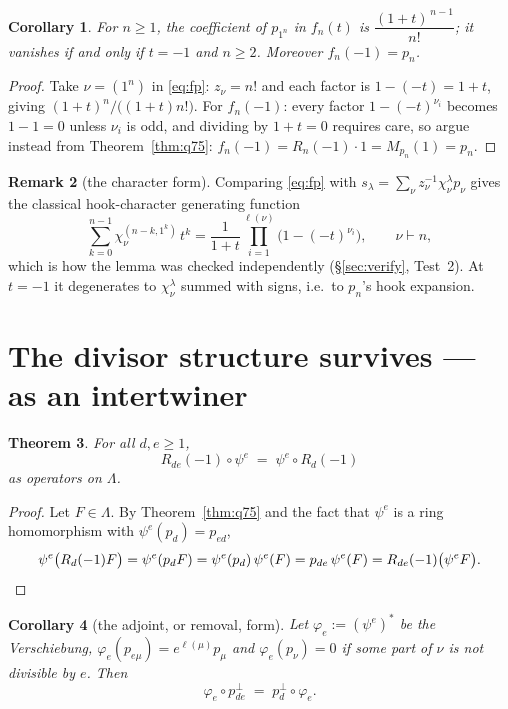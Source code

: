 \documentclass[11pt]{article}
\newtheorem{theorem}{Theorem}
\newtheorem{corollary}[theorem]{Corollary}
\theoremstyle{definition}
\newtheorem{remark}[theorem]{Remark}
\newcommand{\Lam}{\Lambda}
\newcommand{\Mult}[1]{M_{#1}}
\begin{document}
\begin{corollary}\label{cor:coeff}
For $n\ge1$, the coefficient of $p_{1^{n}}$ in $f_n(t)$ is $\dfrac{(1+t)^{\,n-1}}{n!}$; it
vanishes if and only if $t=-1$ and $n\ge2$.  Moreover $f_n(-1)=p_n$.
\end{corollary}

\begin{proof}
Take $\nu=(1^{n})$ in \eqref{eq:fp}: $z_\nu=n!$ and each factor is $1-(-t)=1+t$, giving
$(1+t)^{n}/\bigl((1+t)n!\bigr)$.  For $f_n(-1)$: every factor $1-(-t)^{\nu_i}$ becomes
$1-1=0$ unless $\nu_i$ is odd, and dividing by $1+t=0$ requires care, so argue instead from
Theorem~\ref{thm:q75}: $f_n(-1)=R_n(-1)\cdot1=\Mult{p_n}(1)=p_n$.
\end{proof}

\begin{remark}[the character form]
Comparing \eqref{eq:fp} with $s_\lambda=\sum_\nu z_\nu^{-1}\chi^{\lambda}_\nu p_\nu$ gives the
classical hook-character generating function
\[
  \sum_{k=0}^{n-1}\chi^{(n-k,1^{k})}_{\nu}\,t^{k}
  =\frac{1}{1+t}\prod_{i=1}^{\ell(\nu)}\bigl(1-(-t)^{\nu_i}\bigr),\qquad \nu\vdash n,
\]
which is how the lemma was checked independently (\S\ref{sec:verify}, Test~2).  At $t=-1$ it
degenerates to $\chi^{\lambda}_\nu$ summed with signs, i.e.\ to $p_n$'s hook expansion.
\end{remark}

\section{The divisor structure survives --- as an intertwiner}\label{sec:intertwine}

\begin{theorem}\label{thm:intertwine}
For all $d,e\ge1$,
\[
  R_{de}(-1)\circ\psi^{e}\;=\;\psi^{e}\circ R_{d}(-1)
\]
as operators on $\Lam$.
\end{theorem}

\begin{proof}
Let $F\in\Lam$.  By Theorem~\ref{thm:q75} and the fact that $\psi^{e}$ is a ring
homomorphism with $\psi^{e}(p_d)=p_{ed}$,
\[
  \psi^{e}\bigl(R_d(-1)F\bigr)=\psi^{e}(p_dF)=\psi^{e}(p_d)\,\psi^{e}(F)
  =p_{de}\,\psi^{e}(F)=R_{de}(-1)\bigl(\psi^{e}F\bigr).\qedhere
\]
\end{proof}

\begin{corollary}[the adjoint, or removal, form]\label{cor:versch}
Let $\varphi_e:=(\psi^{e})^{*}$ be the Verschiebung, $\varphi_e(p_{e\mu})=e^{\ell(\mu)}p_\mu$
and $\varphi_e(p_\nu)=0$ if some part of $\nu$ is not divisible by $e$.  Then
\[
  \varphi_e\circ p_{de}^{\perp}\;=\;p_{d}^{\perp}\circ\varphi_e .
\]
\end{corollary}
\end{document}
